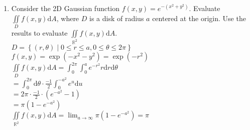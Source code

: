 \begin{enumerate}
	\item Consider the 2D Gaussian function $f(x,y) = e^{-(x^2+y^2)}$. Evaluate $\iint\limits_{D}{f(x,y)\mathrm{d}A}$, where $D$ is a disk of radius $a$ centered at the origin. Use the results to evaluate $\iint\limits_{\mathbb{R}^2}{f(x,y)\mathrm{d}A}$.\\
	\indent
	$D = \left\{(r,\theta) \mid 0 \leq r \leq a, 0 \leq \theta \leq 2\pi \right\}$\\
	$f(x,y) = \exp{(-x^2-y^2)} = \exp{(-r^2)}$\\
	$\iint\limits_{D}{f(x,y)\mathrm{d}A} = \int_{0}^{2\pi}{\int_{0}^{a}{e^{-r^2}r\mathrm{d}r}\mathrm{d}\theta}$\\
	$= \int_{0}^{2\pi}{\mathrm{d}\theta} \cdot \frac{-1}{2}\int_{0}^{-a^2}{e^{u}\mathrm{d}u}$\\
	$= 2\pi \cdot \frac{-1}{2} \cdot \left(e^{-a^2} - 1\right)$\\
	$= \pi\left(1 - e^{-a^2}\right)$\\
	$\iint\limits_{\mathbb{R}^2}{f(x,y)\mathrm{d}A} = \lim_{a \to \infty}{\pi\left(1 - e^{-a^2}\right)} = \pi$\\
\end{enumerate}